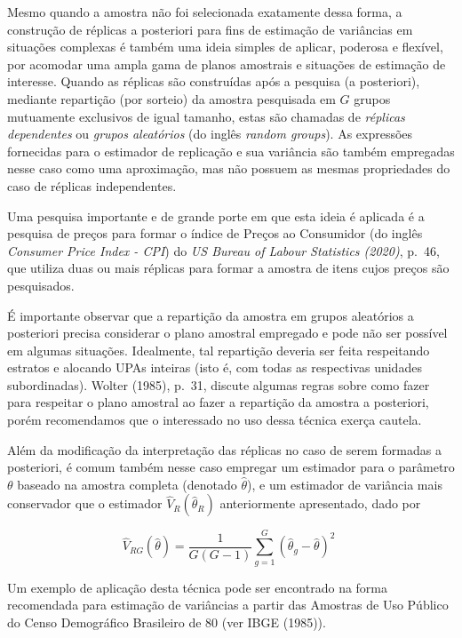 \documentclass[
  12pt,
  brazilian,
]{book}
\theoremstyle{definition}
\theoremstyle{definition}
\theoremstyle{definition}
\theoremstyle{definition}
\theoremstyle{remark}
\begin{document}
Mesmo quando a amostra não foi selecionada exatamente dessa forma, a construção de réplicas a posteriori para fins de estimação de variâncias em situações complexas é também uma ideia simples de aplicar, poderosa e flexível, por acomodar uma ampla gama de planos amostrais e situações de estimação de interesse. Quando as réplicas são construídas após a pesquisa (a posteriori), mediante repartição (por sorteio) da amostra pesquisada em \(G\) grupos mutuamente exclusivos de igual tamanho, estas são chamadas de \emph{réplicas dependentes} ou \emph{grupos aleatórios} (do inglês \emph{random groups}). As expressões fornecidas para o estimador de replicação e sua
variância são também empregadas nesse caso como uma aproximação, mas não possuem as mesmas propriedades do caso de réplicas independentes.

Uma pesquisa importante e de grande porte em que esta ideia é aplicada é a pesquisa de preços para formar o índice de Preços ao Consumidor (do inglês \emph{Consumer Price Index - CPI}) do \emph{US Bureau of Labour Statistics (2020)}, p.~46, que utiliza duas ou mais réplicas para formar a amostra de itens cujos preços são pesquisados.

É importante observar que a repartição da amostra em grupos aleatórios a posteriori precisa considerar o plano amostral empregado e pode não ser possível em algumas situações. Idealmente, tal repartição deveria ser feita respeitando estratos e alocando UPAs inteiras (isto é, com todas as respectivas unidades subordinadas). Wolter (1985), p.~31, discute algumas regras sobre como fazer para respeitar o plano amostral ao fazer a repartição da amostra a posteriori, porém recomendamos que o interessado no uso dessa técnica exerça cautela.

Além da modificação da interpretação das réplicas no caso de serem formadas a posteriori, é comum também nesse caso empregar um estimador para o parâmetro \(\theta\) baseado na amostra completa (denotado \(\widehat{\theta}\)), e um estimador de variância mais conservador que o estimador \(\widehat{V}_{R}\left( \widehat{\theta }_{R}\right)\) anteriormente apresentado, dado por

\begin{equation}
\widehat{V}_{RG}\left( \widehat{\theta }\right) =\frac{1}{G\left( G-1\right) 
}\sum_{g=1}^{G}\left( \widehat{\theta }_{g}-\widehat{\theta }\right) ^{2} \,\,
\label{eq:estpa26}
\end{equation}

Um exemplo de aplicação desta técnica pode ser encontrado na forma recomendada para estimação de variâncias a partir das Amostras de Uso Público do Censo Demográfico Brasileiro de 80 (ver IBGE (1985)).
\end{document}
